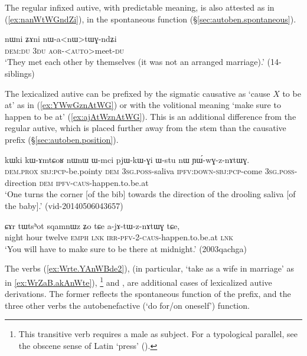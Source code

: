 The regular infixed autive, with predictable meaning, is also attested as in  (\ref{ex:nanWtWGndZi}), in the spontaneous function (§\ref{sec:autoben.spontaneous}).

\begin{exe}
\ex \label{ex:nanWtWGndZi}
\gll nɯni ʑɤni nɯ-a<nɯ>tɯɣ-ndʑi \\
\textsc{dem}:\textsc{du} \textsc{3du}
\textsc{aor}-<\textsc{auto}>meet-\textsc{du} \\
\glt `They met each other by themselves (it was not an arranged marriage).' (14-siblings) 
\end{exe}

The lexicalized autive  can be prefixed by the sigmatic causative as  `cause $X$ to be at' as in (\ref{ex:YWwGznAtWG}) or with the volitional meaning `make sure to happen to be at' (\ref{ex:ajAtWznAtWG}). This is an additional difference from the regular autive, which is placed further away from the stem than the causative prefix (§\ref{sec:autoben.position}).

\begin{exe}
\ex \label{ex:YWwGznAtWG}
\gll kɯki kɯ-ɤmtɕoʁ nɯnɯ ɯ-mci pjɯ-kɯ-ɣi ɯ-stu nɯ ɲɯ́-wɣ-z-nɤtɯɣ. \\
\textsc{dem}.\textsc{prox} \textsc{sbj}:\textsc{pcp}-be.pointy \textsc{dem} \textsc{3sg}.\textsc{poss}-saliva \textsc{ipfv}:\textsc{down}-\textsc{sbj}:\textsc{pcp}-come \textsc{3sg}.\textsc{poss}-direction \textsc{dem} \textsc{ipfv}-\textsc{caus}-happen.to.be.at \\
\glt `One turns the corner [of the bib] towards the direction of the drooling saliva [of the baby].' (vid-20140506043657)
\end{exe}

\begin{exe}
\ex \label{ex:ajAtWznAtWG}
\gll ɕɤr tɯtsʰot sqamnɯz ʑo tɕe a-jɤ-tɯ-z-nɤtɯɣ tɕe, \\
 night hour twelve \textsc{emph} \textsc{lnk}  \textsc{irr}-\textsc{pfv}-2-\textsc{caus}-happen.to.be.at \textsc{lnk} \\
\glt `You will have to make sure to be there at midnight.' (2003qachga)
\end{exe}
 

The verbs  (\ref{ex:Wrte.YAnWBde2}),  (in particular, `take as a wife in marriage' as in \ref{ex:WrZaB.akAnWte}), \footnote{This transitive verb requires a male as subject. For a typological parallel, see the obscene sense of Latin  `press' (\citealt[182]{adams90latin}). } and , are additional cases of lexicalized autive derivations. The former  reflects the spontaneous function of the  prefix, and the three other verbs the autobenefactive (`do for/on oneself') function.
  
